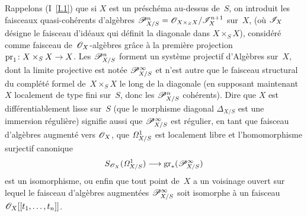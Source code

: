 \setcounter{subsection}{17}

\begin{remarques}
\label{rem:II.4.18}
Rappelons (I~\ref{I.1}) que si $X$ est un pr\'esch\'ema au-dessus
de~$S$, on introduit les faisceaux quasi-coh\'erents
d'alg\`ebres
$\cal{P}_{X/S}^n=\cal{O}_{X\times_S X}/\cal{I}_X^{n+1}$ sur~$X$,
(o\`u $\cal{I}_X$ d\'esigne le faisceau
d'id\'eaux
qui d\'efinit la diagonale dans $X\times_S X$), consid\'er\'e comme
faisceau de~$\cal{O}_X$-alg\`ebres gr\^ace \`a la premi\`ere
projection $\pr_1\colon X\times_S X\to X$. Les
$\cal{P}_{X/S}^n$ forment un syst\`eme projectif d'Alg\`ebres sur~$X$, dont la limite projective est not\'ee $\cal{P}_{X/S}^{\infty}$
et n'est autre que le faisceau structural du compl\'et\'e formel
de~$X\times_S X$ le long de la diagonale (en supposant maintenant $X$
localement de type fini sur~$S$, donc les $\cal{P}_{X/S}^n$
coh\'erents). Dire que $X$ est diff\'erentiablement lisse sur~$S$
(\ie que le morphisme diagonal $\Delta_{X/S}$ est une immersion
r\'eguli\`ere) signifie aussi que $\cal{P}_{X/S}^{\infty}$ est
r\'egulier, en tant que faisceau d'alg\`ebres augment\'e vers
$\cal{O}_X$, \ie que $\it{\Omega}_{X/S}^1$ est localement libre et
l'homomorphisme surjectif canonique
$$
S_{\cal{O}_X}(\it{\Omega}_{X/S}^1)\to
\mathrm{gr}_*(\cal{P}_{X/S}^{\infty})
$$
est un isomorphisme, ou enfin que tout point de~$X$
a
un voisinage ouvert sur lequel le faisceau
d'alg\`ebres
augment\'ees $\cal{P}_{X/S}^{\infty}$ soit isomorphe \`a un
faisceau $\cal{O}_X[[t_1,\dots,t_n]]$.


\end{remarques}
